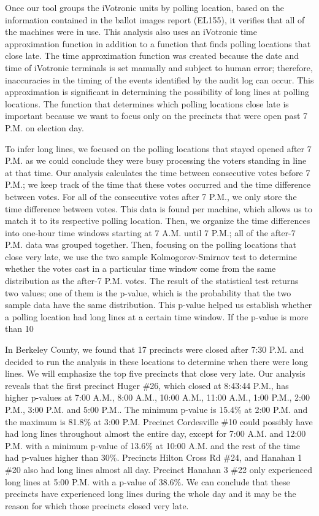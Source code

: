 Once our tool groups the iVotronic units by polling location, based on the information contained in the ballot images report (EL155), it verifies that all of the machines were in use. This analysis also uses an iVotronic time approximation function in addition to a function that finds polling locations that close late. The time approximation function was created because the date and time of iVotronic terminals is set manually and subject to human error; therefore, inaccuracies in the timing of the events identified by the audit log can occur.  This approximation is significant in determining the possibility of long lines at polling locations.  The function that determines which polling locations close late is important because we want to focus only on the precincts that were open past 7 P.M. on election day.

To infer long lines, we focused on the polling locations that stayed opened after 7 P.M. as we could conclude they were busy processing the voters standing in line at that time. Our analysis calculates the time between consecutive votes before 7 P.M.; we keep track of the time that these votes occurred and the time difference between votes.  For all of the consecutive votes after 7 P.M., we only store the time difference between votes.  This data is found per machine, which allows us to match it to its respective polling location.  Then, we organize the time differences into one-hour time windows starting at 7 A.M. until 7 P.M.; all of the after-7 P.M. data was grouped together.  Then, focusing on the polling locations that close very late, we use the two sample Kolmogorov-Smirnov test to determine whether the votes cast in a particular time window come from the same distribution as the after-7 P.M. votes.  The result of the statistical test returns two values; one of them is the p-value, which is the probability that the two sample data have the same distribution.  This p-value helped us establish whether a polling location had long lines at a certain time window.  If the p-value is more than 10%

In Berkeley County, we found that 17 precincts were closed after 7:30 P.M. and decided to run the analysis in these locations to determine when there were long lines.  We will emphasize the top five precincts that close very late.  Our analysis reveals that the first precinct Huger \#26, which closed at 8:43:44 P.M., has higher p-values at 7:00 A.M., 8:00 A.M., 10:00 A.M., 11:00 A.M., 1:00 P.M., 2:00 P.M., 3:00 P.M. and 5:00 P.M..  The minimum p-value is 15.4\% at 2:00 P.M. and the maximum is 81.8\% at 3:00 P.M.  Precinct Cordesville \#10 could possibly have had long lines throughout almost the entire day, except for 7:00 A.M. and 12:00 P.M. with a minimum p-value of 13.6\% at 10:00 A.M. and the rest of the time had p-values higher than 30\%.  Precincts Hilton Cross Rd \#24, and Hanahan 1 \#20 also had long lines almost all day.  Precinct Hanahan 3 \#22 only experienced long lines at 5:00 P.M. with a p-value of 38.6\%.  We can conclude that these precincts have experienced long lines during the whole day and it may be the reason for which those precincts closed very late.

